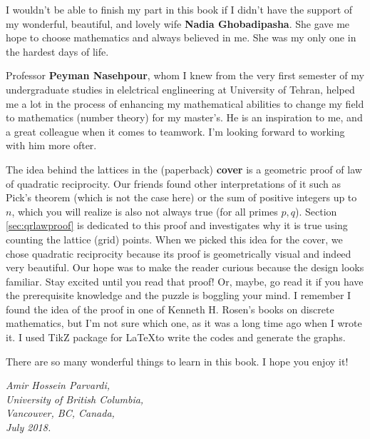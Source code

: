 \documentclass[leqno, 12pt]{book}
\begin{document}
	\vspace{0.3cm}
	
	I wouldn't be able to finish my part in this book if I didn't have the support of my wonderful, beautiful, and lovely wife \textbf{Nadia Ghobadipasha}. She gave me hope to choose mathematics and always believed in me. She was my only one in the hardest days of life.
	
	\vspace{0.3cm}
	
	Professor \textbf{Peyman Nasehpour}, whom I knew from the very first semester of my undergraduate studies in elelctrical englineering at University of Tehran, helped me a lot in the process of enhancing my mathematical abilities to change my field to mathematics (number theory) for my master's.  He is an inspiration to me, and a great colleague when it comes to teamwork. I'm looking forward to working with him more ofter.
	
	\vspace{0.3cm}
	
	The idea behind the lattices in the (paperback) \textbf{cover} is a geometric proof of law of quadratic reciprocity. Our friends found other interpretations of it such as Pick's theorem (which is not the case here) or the sum of positive integers up to $n$, which you will realize is also not always true (for all primes $p,q$). Section \eqref{sec:qrlawproof} is dedicated to this proof and investigates why it is true using counting the lattice (grid) points. When we picked this idea for the cover, we chose quadratic reciprocity because its proof is geometrically visual and indeed very beautiful. Our hope was to make the reader curious because the design looks familiar. Stay excited until you read that proof! Or, maybe, go read it if you have the prerequisite knowledge and the puzzle is boggling your mind. I remember I found the idea of the proof in one of Kenneth H. Rosen's books on discrete mathematics, but I'm not sure which one, as it was a long time ago when I wrote it. I used TikZ package for \LaTeX to write the codes and generate the graphs. 
	
	\vspace{0.3cm}
	
	There are so many wonderful things to learn in this book. I hope you enjoy it!
		\begin{flushright}
		\sl Amir Hossein Parvardi,\\
		University of British Columbia,\\
		Vancouver, BC, Canada,\\
		July 2018.
	\end{flushright}
	
\end{document}
